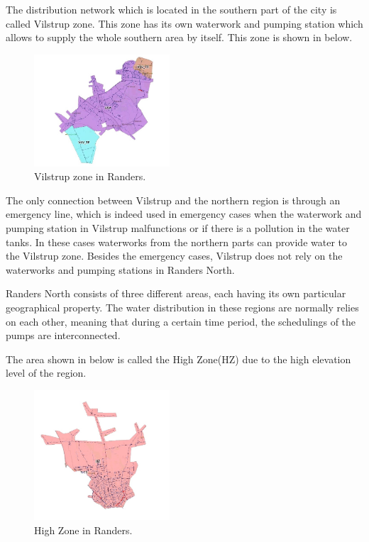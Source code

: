 The distribution network which is located in the southern part of the city is called Vilstrup zone. This zone has its own waterwork and pumping station which allows to supply the whole southern area by itself. This zone is shown in  below.

\begin{figure}[H]
\centering
\includegraphics[width=0.45\textwidth]{report/pictures/Vilstrup_region}
\caption{Vilstrup zone in Randers.}
\label{fig:vilstrup_region}
\end{figure}

The only connection between Vilstrup and the northern region is through an emergency line, which is indeed used in emergency cases when the waterwork and pumping station in Vilstrup malfunctions or if there is a pollution in the water tanks. In these cases waterworks from the northern parts can provide water to the Vilstrup zone. Besides the emergency cases, Vilstrup does not rely on the waterworks and pumping stations in Randers North.  

Randers North consists of three different areas, each having its own particular geographical property. The water distribution in these regions are normally relies on each other, meaning that during a certain time period, the schedulings of the pumps are interconnected. 

The area shown in  below is called the High Zone(HZ) due to the high elevation level of the region. 

\begin{figure}[H]
\centering
\includegraphics[width=0.45\textwidth]{report/pictures/Highzone_region}
\caption{High Zone in Randers.}
\label{fig:highzone_region}
\end{figure}


